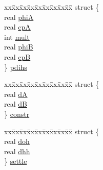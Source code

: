 \begin{DoxyCompactItemize}
\begin{tabbing}
\end{tabbing}\item 
\begin{tabbing}
xx\=xx\=xx\=xx\=xx\=xx\=xx\=xx\=xx\=\kill
struct \{\\
\>real \hyperlink{uniont__iparams_a5c5b19324d8c524116233ac74540ce52}{phiA}\\
\>real \hyperlink{uniont__iparams_aa78ce5b05658d1160eb2e5fe986f93c0}{cpA}\\
\>int \hyperlink{uniont__iparams_a82b5289409257f018d5bee20af8a2296}{mult}\\
\>real \hyperlink{uniont__iparams_ad10fa405ec35e5d43c4fec2a1354787c}{phiB}\\
\>real \hyperlink{uniont__iparams_a6e446e230c4e90edebae546ec6be330b}{cpB}\\
\} \hyperlink{uniont__iparams_af657cabbeb282d78b893cd1820599e24}{pdihs}\\

\end{tabbing}\item 
\begin{tabbing}
xx\=xx\=xx\=xx\=xx\=xx\=xx\=xx\=xx\=\kill
struct \{\\
\>real \hyperlink{uniont__iparams_aca19251b9d45dd2930a1ece711182fd4}{dA}\\
\>real \hyperlink{uniont__iparams_ab3c14f8f5a3a4cac1c17b7faf8781a45}{dB}\\
\} \hyperlink{uniont__iparams_a9ce5865b1240c2b740498eedd7e97246}{constr}\\

\end{tabbing}\item 
\begin{tabbing}
xx\=xx\=xx\=xx\=xx\=xx\=xx\=xx\=xx\=\kill
struct \{\\
\>real \hyperlink{uniont__iparams_add93dcbb4cbf1489f4fc3a3fb53f5df8}{doh}\\
\>real \hyperlink{uniont__iparams_abcc06078f0a3427791743279fc556b2e}{dhh}\\
\} \hyperlink{uniont__iparams_af9c4423f68515910156b3f3a9b03c1e6}{settle}\\


\end{tabbing}
\end{DoxyCompactItemize}
